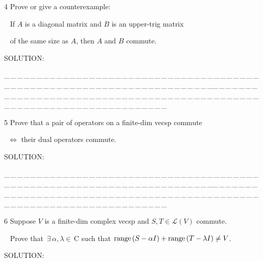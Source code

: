 \documentclass[a4paper, 11pt, UTF8]{article}
\def\range{\textup{range}\,}
\def\Lm{\mathcal{L}}
\def\Cbf{$\,{\timesbf C}\,$}
\begin{document}
\begin{large}
{\timesbf\Large 4} {\timessl\Large 
Prove or give a counterexample:}\par\,\,\,
{\timessl\Large If $A$ is a diagonal matrix and $B$ is an upper-trig matrix}\par\,\,\,
{\timessl\Large of the same size as $A$, then $A$ and $B$ commute.
}\par
{\timesbf S\footnotesize{OLUTION:}}\par\quad

\par
{\tiny \_\,\_\,\_\,\_\,\_\,\_\,\_\,\_\,\_\,\_\,\_\,\_\,\_\,\_\,\_\,\_\,\_\,\_\,\_\,\_\,\_\,\_\,\_\,\_\,\_\,\_\,\_\,\_\,\_\,\_\,\_\,\_\,\_\,\_\,\_\,\_\,\_\,\_\,\_\,\_\,\_\,\_\,\_\,\_\,\_\,\_\,\_\,\_\,\_\,\_\,\_\,\_\,\_\,\_\,\_\,\_\,\_\,\_\,\_\,\_\,\_\,\_\,\_\,\_\,\_\,\_\,\_\,\_\,\_\,\_\,\_\_\,\_\,\_\,\_\,\_\,\_\,\_\,\_\,\_\,\_\,\_\,\_\,\_\,\_\,\_\,\_\,\_\,\_\,\_\,\_\,\_\,\_\,\_\,\_\,\_\,\_\,\_\,\_\,\_\,\_\,\_\,\_\,\_\,\_\,\_\,\_\,\_\,\_\,\_\,\_\,\_\,\_\,\_\,\_\,\_\,\_\,\_\,\_\,\_\,\_\,\_\,\_\,\_\,\_\,\_\,\_\,\_\,\_\,\_\,\_\,\_\,\_\,\_\,\_\,\_\,\_\,\_\,\_\,\_\,\_\,\_}\par

{\timesbf\Large 5} {\timessl\Large 
Prove that a pair of operators on a finite-dim vecsp commute}\par\qquad\quad\,
{\timessl\Large $\Longleftrightarrow$ their dual operators commute.
}\par
{\timesbf S\footnotesize{OLUTION:}}\par\quad

\par
{\tiny \_\,\_\,\_\,\_\,\_\,\_\,\_\,\_\,\_\,\_\,\_\,\_\,\_\,\_\,\_\,\_\,\_\,\_\,\_\,\_\,\_\,\_\,\_\,\_\,\_\,\_\,\_\,\_\,\_\,\_\,\_\,\_\,\_\,\_\,\_\,\_\,\_\,\_\,\_\,\_\,\_\,\_\,\_\,\_\,\_\,\_\,\_\,\_\,\_\,\_\,\_\,\_\,\_\,\_\,\_\,\_\,\_\,\_\,\_\,\_\,\_\,\_\,\_\,\_\,\_\,\_\,\_\,\_\,\_\,\_\,\_\_\,\_\,\_\,\_\,\_\,\_\,\_\,\_\,\_\,\_\,\_\,\_\,\_\,\_\,\_\,\_\,\_\,\_\,\_\,\_\,\_\,\_\,\_\,\_\,\_\,\_\,\_\,\_\,\_\,\_\,\_\,\_\,\_\,\_\,\_\,\_\,\_\,\_\,\_\,\_\,\_\,\_\,\_\,\_\,\_\,\_\,\_\,\_\,\_\,\_\,\_\,\_\,\_\,\_\,\_\,\_\,\_\,\_\,\_\,\_\,\_\,\_\,\_\,\_\,\_\,\_\,\_\,\_\,\_\,\_\,\_}\par

{\timesbf\Large 6} {\timessl\Large 
Suppose $V$ is a finite-dim complex vecsp and $S, T\in\Lm(V)$ commute.}\par\,\,\,
{\timessl\Large Prove that $\,\exists\,\alpha,\lambda\in\Cbf\,$such that $\range(S -\alpha I) + \range(T -\lambda I)\neq V$.
}\par
{\timesbf S\footnotesize{OLUTION:}}\par\quad


\end{large}
\end{document}
